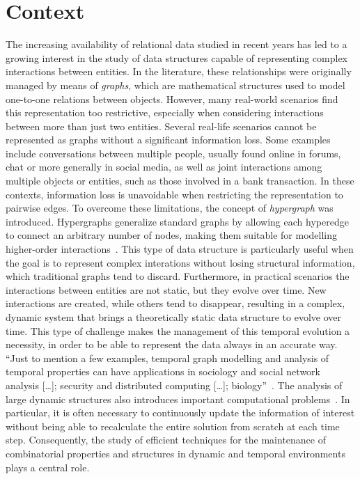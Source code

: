 
\section{Context}\label{sec:context}

The increasing availability of relational data studied in recent years has led to a growing interest in the study of data structures capable of representing complex interactions between entities.
In the literature, these relationships were originally managed by means of \emph{graphs}, which are mathematical structures used to model one-to-one relations between objects.
However, many real-world scenarios find this representation too restrictive, especially when considering interactions between more than just two entities.
Several real-life scenarios cannot be represented as graphs without a significant information loss.
Some examples include conversations between multiple people, usually found online in forums, chat or more generally in social media, as well as joint interactions among multiple objects or entities, such as those involved in a bank transaction.
In these contexts, information loss is unavoidable when restricting the representation to pairwise edges.
To overcome these limitations, the concept of \emph{hypergraph} was introduced.
Hypergraphs generalize standard graphs by allowing each hyperedge to connect an arbitrary number of nodes, making them suitable for modelling higher-order interactions~\cite{antelmi2023}.
This type of data structure is particularly useful when the goal is to represent complex interations without losing structural information, which traditional graphs tend to discard.
Furthermore, in practical scenarios the interactions between entities are not static, but they evolve over time.
New interactions are created, while others tend to disappear, resulting in a complex, dynamic system that brings a theoretically static data structure to evolve over time.
This type of challenge makes the management of this temporal evolution a necessity, in order to be able to represent the data always in an accurate way.
``Just to mention a few examples, temporal graph modelling and analysis of temporal properties can have applications in sociology and social network analysis [\ldots]; security and distributed computing [\ldots]; biology''~\cite{lotito2020}.
The analysis of large dynamic structures also introduces important computational problems~\cite{lotito2020}.
In particular, it is often necessary to continuously update the information of interest without being able to recalculate the entire solution from scratch at each time step.
Consequently, the study of efficient techniques for the maintenance of combinatorial properties and structures in dynamic and temporal environments plays a central role.